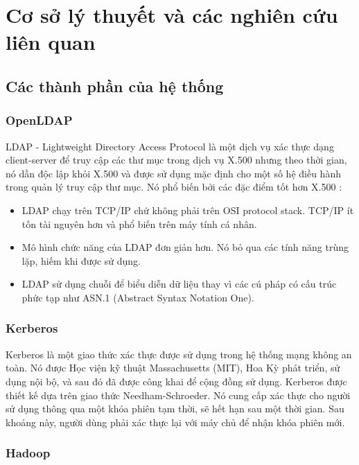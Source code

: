 \section{Cơ sở lý thuyết và các nghiên cứu liên quan}
\label{section3-background}

\subsection{Các thành phần của hệ thống}
\subsubsection{OpenLDAP}

LDAP - Lightweight Directory Access Protocol là một dịch vụ xác thực dạng client-server để truy cập các thư mục trong dịch vụ X.500 nhưng theo thời gian, nó dần độc lập khỏi X.500 và được sử dụng mặc định cho một số hệ điều hành trong quản lý truy cập thư mục. Nó phổ biến bởi các đặc điểm tốt hơn X.500 \cite{johner1998understanding} :
\begin{itemize}
    \item LDAP chạy trên TCP/IP chứ không phải trên OSI  protocol stack. TCP/IP ít tốn tài nguyên hơn và phổ biến trên máy tính cá nhân.
    \item Mô hình chức năng của LDAP đơn giản hơn. Nó bỏ qua các tính năng trùng lặp, hiếm khi được sử dụng.
    \item LDAP sử dụng chuỗi để biểu diễn dữ liệu thay vì các cú pháp có cấu trúc phức tạp như ASN.1 (Abstract Syntax Notation One).
\end{itemize}

\subsubsection{Kerberos}

Kerberos là một giao thức xác thực được sử dụng trong hệ thống mạng không an toàn. Nó được Học viện kỹ thuật Massachusetts (MIT), Hoa Kỳ phát triển, sử dụng nội bộ, và sau đó đã được công khai để cộng đồng sử dụng. Kerberos được thiết kế dựa trên giao thức Needham-Schroeder. Nó cung cấp xác thực cho người sử dụng thông qua một khóa phiên tạm thời, sẽ hết hạn sau một thời gian. Sau khoảng này, người dùng phải xác thực lại với máy chủ để nhận khóa phiên mới.

\subsubsection{Hadoop}

